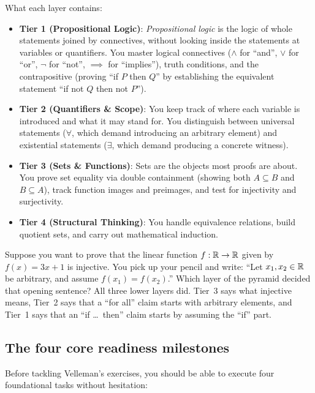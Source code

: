What each layer contains:
\begin{itemize}
\item \textbf{Tier 1 (Propositional Logic)}: \emph{Propositional logic} is the logic of whole statements joined by connectives, without looking inside the statements at variables or quantifiers. You master logical connectives ($\land$ for ``and'', $\lor$ for ``or'', $\neg$ for ``not'', $\implies$ for ``implies''), truth conditions, and the contrapositive (proving ``if $P$ then $Q$'' by establishing the equivalent statement ``if not $Q$ then not $P$'').
\item \textbf{Tier 2 (Quantifiers \& Scope)}: You keep track of where each variable is introduced and what it may stand for. You distinguish between universal statements ($\forall$, which demand introducing an arbitrary element) and existential statements ($\exists$, which demand producing a concrete witness).
\item \textbf{Tier 3 (Sets \& Functions)}: Sets are the objects most proofs are about. You prove set equality via double containment (showing both $A \subseteq B$ and $B \subseteq A$), track function images and preimages, and test for injectivity and surjectivity.
\item \textbf{Tier 4 (Structural Thinking)}: You handle equivalence relations, build quotient sets, and carry out mathematical induction.
\end{itemize}

\begin{walkbox}
Suppose you want to prove that the linear function $f: \mathbb{R} \to \mathbb{R}$ given by $f(x) = 3x + 1$ is injective. You pick up your pencil and write: ``Let $x_1, x_2 \in \mathbb{R}$ be arbitrary, and assume $f(x_1) = f(x_2)$.'' Which layer of the pyramid decided that opening sentence? All three lower layers did. Tier~3 says what injective means, Tier~2 says that a ``for all'' claim starts with arbitrary elements, and Tier~1 says that an ``if \dots\ then'' claim starts by assuming the ``if'' part.
\end{walkbox}

\subsection{The four core readiness milestones}
\label{26:sec-milestones}

Before tackling Velleman's exercises, you should be able to execute four foundational tasks without hesitation:


